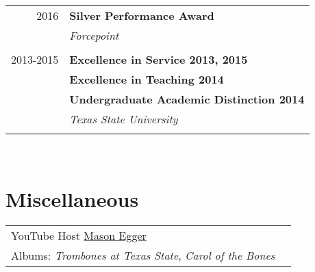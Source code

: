\documentclass[10pt]{article} %
\begin{document}
\begin{minipage}[t]{0.44\textwidth}
\begin{tabular}{rl}
2016     & \textbf{Silver Performance Award}\\
& \textit{Forcepoint}\\ \\

2013-2015     & \textbf{Excellence in Service 2013, 2015}\\
& \textbf{Excellence in Teaching 2014}\\
& \textbf{Undergraduate Academic Distinction 2014}\\
& \textit{Texas State University}\\\\

\end{tabular}\\




\section{Miscellaneous} 

\begin{tabular}{ll}
YouTube Host \href{https://www.youtube.com/masonegger}{Mason Egger}\\
Albums: \textit{Trombones at Texas State}, \textit{Carol of the Bones} \\
\end{tabular}\\

\end{minipage}
\end{document}
